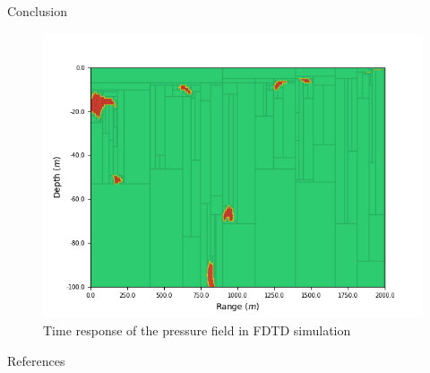 \documentclass[9pt, xcolor={usenames, dvipsnames}]{beamer}
\begin{document}
\begin{frame}{Conclusion}
\begin{minipage}{0.46\textwidth}
\begin{figure}
						\includegraphics[width=\textwidth]{images/localisation/Intersection_20_40_60.png}
						\caption{Time response of the pressure field in FDTD simulation}
					\end{figure}
				\end{minipage}
			\end{frame}

		\begin{frame}{References}
			\printbibliography
		\end{frame}
\end{document}
